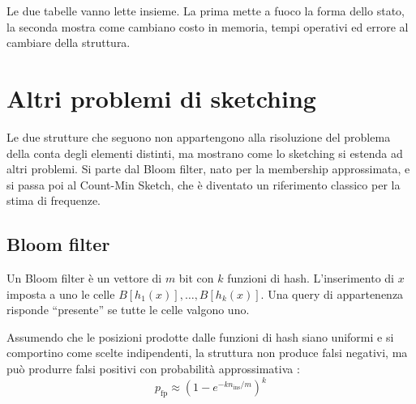 \begin{table}[htbp]
    \centering
    \scriptsize
    \setlength{\tabcolsep}{3pt}
    \renewcommand{\arraystretch}{1.15}
    \caption{Confronto di complessità e comportamento dell'errore per gli algoritmi principali}
    \label{tab:confronto-complessita-count-distinct}
\end{table}

Le due tabelle vanno lette insieme. La prima mette a fuoco la forma dello
stato, la seconda mostra come cambiano costo in memoria, tempi operativi ed
errore al cambiare della struttura.

\section{Altri problemi di sketching}
Le due strutture che seguono non appartengono alla risoluzione del problema della conta degli elementi distinti,
ma mostrano come lo sketching si estenda ad altri problemi. Si parte dal Bloom filter,
nato per la membership approssimata, e si passa poi al Count-Min Sketch, che è
diventato un riferimento classico per la stima di frequenze.

\subsection{Bloom filter}
\begin{definition}
Un Bloom filter è un vettore di $m$ bit con $k$
funzioni di hash. L'inserimento di $x$ imposta a uno le celle
$B[h_1(x)],\dots,B[h_{k}(x)]$. Una query di appartenenza
risponde ``presente'' se tutte le celle valgono uno.

Assumendo che le posizioni prodotte dalle funzioni di hash siano uniformi e si
comportino come scelte indipendenti, la struttura non produce falsi negativi,
ma può produrre falsi positivi con probabilità approssimativa \cite{Bloom_1970,Agarwal_Trachtenberg_2006}:
\[
p_{\text{fp}}\approx\left(1-e^{-k n_{\text{ins}}/m}\right)^{k}
\]
\end{definition}

